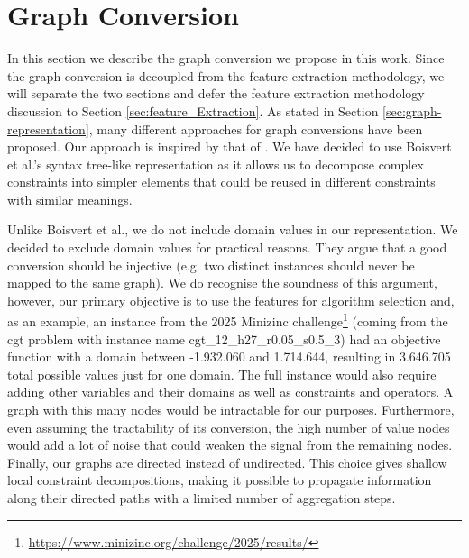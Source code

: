 \section{Graph Conversion}\label{sec:conversion}

In this section we describe the graph conversion we propose in this work. Since the graph conversion is decoupled from the feature extraction methodology, we will separate the two sections and defer the feature extraction methodology discussion to Section \ref{sec:feature_Extraction}. As stated in Section \ref{sec:graph-representation}, many different approaches for graph conversions have been proposed. Our approach is inspired by that of \citet{boisvert2024towards}. We have decided to use Boisvert et al.'s syntax tree-like representation as it allows us to decompose complex constraints into simpler elements that could be reused in different constraints with similar meanings.

Unlike Boisvert et al., we do not include domain values in our representation. We decided to exclude domain values for practical reasons. They argue that a good conversion should be injective (e.g. two distinct instances should never be mapped to the same graph). We do recognise the soundness of this argument, however, our primary objective is to use the features for algorithm selection and, as an example, an instance from the 2025 Minizinc challenge\footnote{\url{https://www.minizinc.org/challenge/2025/results/}} (coming from the cgt problem with instance name cgt\_12\_h27\_r0.05\_s0.5\_3) had an objective function with a domain between -1.932.060 and 1.714.644, resulting in 3.646.705 total possible values just for one domain.
The full instance would also require adding other variables and their domains as well as constraints and operators. A graph with this many nodes would be intractable for our purposes. Furthermore, even assuming the tractability of its conversion, the high number of value nodes would add a lot of noise that could weaken the signal from the remaining nodes. Finally, our graphs are directed instead of undirected. This choice gives shallow local constraint decompositions, making it possible to propagate information along their directed paths with a limited number of aggregation steps.

